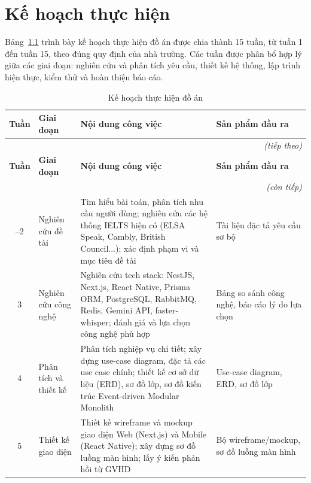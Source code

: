 \chapter{Kế hoạch thực hiện}
\label{app:kehoach}

Bảng~\ref{tab:kehoach} trình bày kế hoạch thực hiện đồ án được chia thành 15 tuần, từ tuần 1 đến tuần 15, theo đúng quy định của nhà trường. Các tuần được phân bổ hợp lý giữa các giai đoạn: nghiên cứu và phân tích yêu cầu, thiết kế hệ thống, lập trình hiện thực, kiểm thử và hoàn thiện báo cáo.

\setlength{\tbu}{\dimexpr(\linewidth - 8\tabcolsep - 5\arrayrulewidth)/130\relax}
\begin{longtable}{|c|p{40\tbu}|p{55\tbu}|p{35\tbu}|}
    \caption{Kế hoạch thực hiện đồ án}
    \label{tab:kehoach} \\
    \hline
    \textbf{Tuần} & \textbf{Giai đoạn} & \textbf{Nội dung công việc} & \textbf{Sản phẩm đầu ra} \\ \hline
    \endfirsthead
    \multicolumn{4}{r}{\footnotesize\textit{(tiếp theo)}} \\
    \hline
    \textbf{Tuần} & \textbf{Giai đoạn} & \textbf{Nội dung công việc} & \textbf{Sản phẩm đầu ra} \\ \hline
    \endhead
    \hline \multicolumn{4}{r}{\footnotesize\textit{(còn tiếp)}} \\
    \endfoot
    \hline
    \endlastfoot
    1--2 & Nghiên cứu đề tài & Tìm hiểu bài toán, phân tích nhu cầu người dùng; nghiên cứu các hệ thống IELTS hiện có (ELSA Speak, Cambly, British Council...); xác định phạm vi và mục tiêu đề tài & Tài liệu đặc tả yêu cầu sơ bộ \\ \hline
    3 & Nghiên cứu công nghệ & Nghiên cứu tech stack: NestJS, Next.js, React Native, Prisma ORM, PostgreSQL, RabbitMQ, Redis, Gemini API, faster-whisper; đánh giá và lựa chọn công nghệ phù hợp & Bảng so sánh công nghệ, báo cáo lý do lựa chọn \\ \hline
    4 & Phân tích và thiết kế & Phân tích nghiệp vụ chi tiết; xây dựng use-case diagram, đặc tả các use case chính; thiết kế cơ sở dữ liệu (ERD), sơ đồ lớp, sơ đồ kiến trúc Event-driven Modular Monolith & Use-case diagram, ERD, sơ đồ lớp \\ \hline
    5 & Thiết kế giao diện & Thiết kế wireframe và mockup giao diện Web (Next.js) và Mobile (React Native); xây dựng sơ đồ luồng màn hình; lấy ý kiến phản hồi từ GVHD & Bộ wireframe/mockup, sơ đồ luồng màn hình \\ \hline

\end{longtable}
